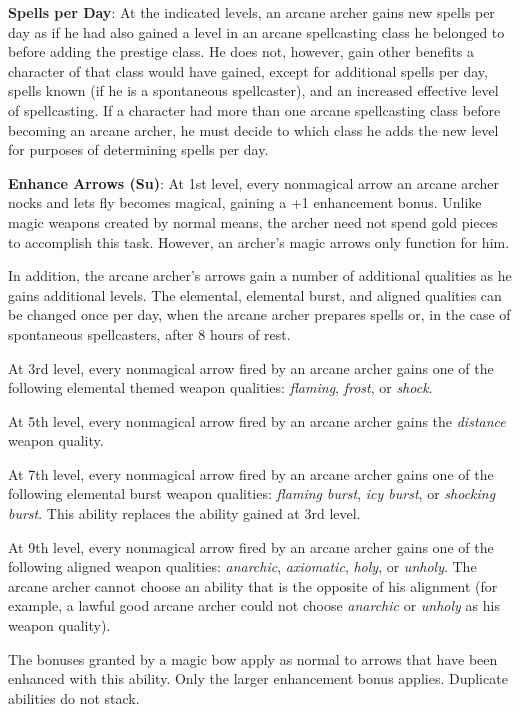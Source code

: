 \textbf{Spells per Day}: At the indicated levels, an arcane archer gains new spells per day as if he had also gained a level in an arcane spellcasting class he belonged to before adding the prestige class. He does not, however, gain other benefits a character of that class would have gained, except for additional spells per day, spells known (if he is a spontaneous spellcaster), and an increased effective level of spellcasting. If a character had more than one arcane spellcasting class before becoming an arcane archer, he must decide to which class he adds the new level for purposes of determining spells per day.
				
\textbf{Enhance Arrows (Su)}: At 1st level, every nonmagical arrow an arcane archer nocks and lets fly becomes magical, gaining a +1 enhancement bonus. Unlike magic weapons created by normal means, the archer need not spend gold pieces to accomplish this task. However, an archer's magic arrows only function for him. 
				
In addition, the arcane archer's arrows gain a number of additional qualities as he gains additional levels. The elemental, elemental burst, and aligned qualities can be changed once per day, when the arcane archer prepares spells or, in the case of spontaneous spellcasters, after 8 hours of rest. 
				
At 3rd level, every nonmagical arrow fired by an arcane archer gains one of the following elemental themed weapon qualities: \textit{flaming},\textit{ frost}, or \textit{shock}. 
				
At 5th level, every nonmagical arrow fired by an arcane archer gains the \textit{distance} weapon quality.
				
At 7th level, every nonmagical arrow fired by an arcane archer gains one of the following elemental burst weapon qualities: \textit{flaming burst}, \textit{icy burst}, or \textit{shocking burst}. This ability replaces the ability gained at 3rd level.
				
At 9th level, every nonmagical arrow fired by an arcane archer gains one of the following aligned weapon qualities: \textit{anarchic}, \textit{axiomatic}, \textit{holy}, or \textit{unholy}. The arcane archer cannot choose an ability that is the opposite of his alignment (for example, a lawful good arcane archer could not choose \textit{anarchic} or \textit{unholy} as his weapon quality).
				
The bonuses granted by a magic bow apply as normal to arrows that have been enhanced with this ability. Only the larger enhancement bonus applies. Duplicate abilities do not stack.
				
